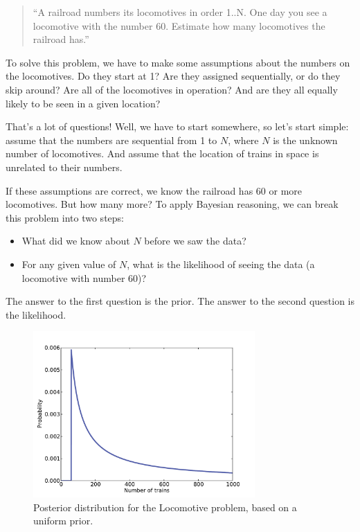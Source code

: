 \documentclass[12pt]{book}
\begin{document}
\begin{quote}
``A railroad numbers its locomotives in order 1..N.  One day you see a
locomotive with the number 60.  Estimate how many locomotives the
railroad has.''
\end{quote}

To solve this problem,
we have to make some assumptions about the numbers on the locomotives.
Do they start at 1?  Are they assigned sequentially, or do they
skip around?  Are all of the locomotives in operation?  And are
they all equally likely to be seen in a given location?

That's a lot of questions!  Well, we have to start somewhere, so let's
start simple: assume that the numbers are sequential from 1 to $N$,
where $N$ is the unknown number of locomotives.  And assume that
the location of trains in space is unrelated to their numbers.

If these assumptions are correct, we know the railroad has 60 or more
locomotives.  But how many more?  To apply Bayesian reasoning, we
can break this problem into two steps:

\begin{itemize}

\item What did we know about $N$ before we saw the
data?

\item For any given value of $N$, what is the likelihood of
seeing the data (a locomotive with number 60)?

\end{itemize}

The answer to the first question is the prior.  The answer to the
second question is the likelihood.

\begin{figure}
\centerline{\includegraphics[height=2.5in]{figs/train1.pdf}}
\caption{Posterior distribution for the Locomotive problem, based
on a uniform prior.}
\label{fig.train1}
\end{figure}
\end{document}

